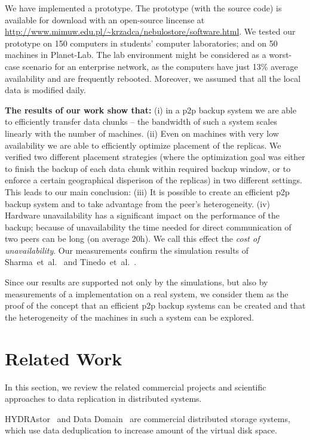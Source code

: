 \documentclass[10pt, final, conference, letterpaper]{IEEEtran}
\begin{document}
We have implemented a prototype. The prototype (with the source code) is available for download with an open-source lincense at \url{http://www.mimuw.edu.pl/~krzadca/nebulostore/software.html}. 
We tested our prototype on 150 computers in students' computer laboratories; and on 50 machines in Planet-Lab. The lab environment might be considered as a worst-case scenario for an enterprise network, as the computers have just 13\% average availability and are frequently rebooted. Moreover, we assumed that all the local data is modified daily. 

\textbf{The results of our work show that:} (i) in a p2p backup system we are able to efficiently transfer data chunks -- the bandwidth of such a system scales linearly with the number of machines. (ii) Even on machines with very low availability we are able to efficiently optimize placement of the replicas. We verified two different placement strategies (where the optimization goal was either to finish the backup of each data chunk within required backup window, or to enforce a certain geographical disperison of the replicas) in two different settings. This leads to our main conclusion: (iii) It is possible to create an efficient p2p backup system and to take advantage from the peer's heterogeneity. 
(iv) Hardware unavailability has a significant impact on the performance of the backup; because of unavailability the time needed for direct communication of two peers can be long (on average 20h). We call this effect the \emph{cost of unavailability}.
Our measurements confirm the simulation results of Sharma~et~al.~\cite{friendstoreAnalysis} and Tinedo~et~al.~\cite{conf/p2p/TinedoAL12}.


Since our results are supported not only by the simulations, but also by measurements of a implementation on a real system, we consider them as the proof of the concept that an efficient p2p backup systems can be created and that the heterogeneity of the machines in such a system can be explored.

\section{Related Work}\label{sec::related-work}

In this section, we review the related commercial projects and scientific approaches to data replication in distributed systems.

HYDRAstor~\cite{hydraStore} and Data Domain~\cite{dataDomain} are commercial distributed storage systems, which use data deduplication to increase amount of the virtual disk space.
\end{document}
